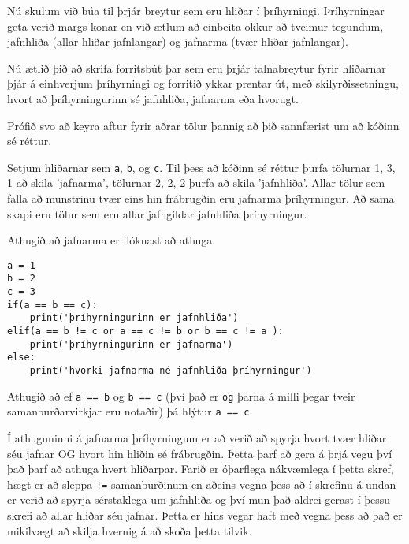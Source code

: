 \begin{exercise}\label{exp4}
Nú skulum við búa til þrjár breytur sem eru hliðar í þríhyrningi.
Þríhyrningar geta verið margs konar en við ætlum að einbeita okkur að tveimur tegundum, jafnhliða (allar hliðar jafnlangar) og jafnarma (tvær hliðar jafnlangar).

Nú ætlið þið að skrifa forritsbút þar sem eru þrjár talnabreytur fyrir hliðarnar þjár á einhverjum þríhyrningi og forritið ykkar prentar út, með skilyrðissetningu, hvort að þríhyrningurinn sé jafnhliða, jafnarma eða hvorugt.

Prófið svo að keyra aftur fyrir aðrar tölur þannig að þið sannfærist um að kóðinn sé réttur.
\end{exercise}
\begin{Answer}[ref={exp4}]
Setjum hliðarnar sem \texttt{a}, \texttt{b}, og \texttt{c}.
Til þess að kóðinn sé réttur þurfa tölurnar 1, 3, 1 að skila 'jafnarma', tölurnar 2, 2, 2 þurfa að skila 'jafnhliða'.
Allar tölur sem falla að munstrinu tvær eins hin frábrugðin eru jafnarma þríhyrningur.
Að sama skapi eru tölur sem eru allar jafngildar jafnhliða þríhyrningur.

Athugið að jafnarma er flóknast að athuga.
	\begin{lstlisting}
a = 1
b = 2
c = 3
if(a == b == c):
	print('þríhyrningurinn er jafnhliða')
elif(a == b != c or a == c != b or b == c != a ):
	print('þríhyrningurinn er jafnarma')
else:
	print('hvorki jafnarma né jafnhliða þríhyrningur')\end{lstlisting}

Athugið að ef \texttt{a == b} og \texttt{b == c} (því það er \texttt{og} þarna á milli þegar tveir samanburðarvirkjar eru notaðir) þá hlýtur \texttt{a == c}.

Í athuguninni á jafnarma þríhyrningum er að verið að spyrja hvort tvær hliðar séu jafnar OG hvort hin hliðin sé frábrugðin.
Þetta þarf að gera á þrjá vegu því það þarf að athuga hvert hliðarpar.
Farið er óþarflega nákvæmlega í þetta skref, hægt er að sleppa \texttt{!=} samanburðinum en aðeins vegna þess að í skrefinu á undan er verið að spyrja sérstaklega um jafnhliða og því mun það aldrei gerast í þessu skrefi að allar hliðar séu jafnar.
Þetta er hins vegar haft með vegna þess að það er mikilvægt að skilja hvernig á að skoða þetta tilvik.
\end{Answer}

